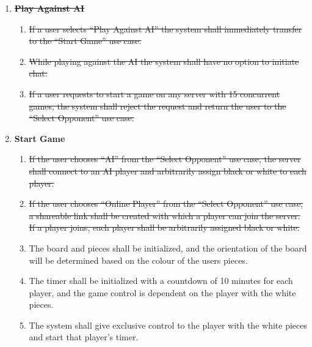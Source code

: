 \documentclass[12pt, titlepage]{article}
\begin{document}
\begin{enumerate}[{UC}1.]
        	\item \textbf{\sout{Play Against AI}}
        	\begin{enumerate}[{FR}1., resume]
        		\item \sout{If a user selects ``Play Against AI'' the system shall immediately transfer to the ``Start Game'' use case.}
                \item \sout{While playing against the AI the system shall have no option to initiate chat.}
        		\item \sout{If a user requests to start a game on any server with 15 concurrent games, the system shall reject the request and return the user to the ``Select Opponent'' use case.}
        	\end{enumerate}
        	
        	\item \textbf{Start Game}
        	\begin{enumerate}[{FR}1., resume]
        		\item \sout{If the user chooses ``AI'' from the ``Select Opponent'' use case, the server shall connect to an AI player and arbitrarily assign black or white to each player.}
        		\item \sout{If the user chooses ``Online Player'' from the ``Select Opponent'' use case, a shareable link shall be created with which a player can join the server. If a player joins, each player shall be arbitrarily assigned black or white.}
        		\item The board and pieces shall be initialized, and the orientation of the board will be determined based on the colour of the users pieces. 
        		\item The timer shall be initialized with a countdown of 10 minutes for each player, and the game control is dependent on the player with the white pieces.
        		\item The system shall give exclusive control to the player with the white pieces and start that player's timer.
        	\end{enumerate}
        	

\end{enumerate}
\end{document}

